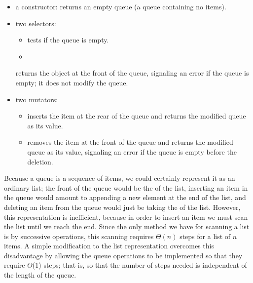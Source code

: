 \begin{itemize}

	\item
		a constructor:
		 returns an empty queue (a queue containing no items).

	\item
		two selectors:
		\begin{itemize}

			\item
				 tests if the queue is empty.

			\item

		\end{itemize}
		returns the object at the front of the queue, signaling an error if the queue is empty;
		it does not modify the queue.

	\item
		two mutators:
		\begin{itemize}

			\item
				 inserts the item at the rear of the queue and returns the modified queue as its value.

			\item
				 removes the item at the front of the queue and returns the modified queue as its value, signaling an error if the queue is empty before the deletion.

	\end{itemize}
\end{itemize}

Because a queue is a sequence of items, we could certainly represent it as an ordinary list;
the front of the queue would be the  of the list, inserting an item in the queue would amount to appending a new element at the end of the list, and deleting an item from the queue would just be taking the  of the list.
However, this representation is inefficient, because in order to insert an item we must scan the list until we reach the end.
Since the only method we have for scanning a list is by successive  operations, this scanning requires \( Θ(n) \) steps for a list of \( n \) items.
A simple modification to the list representation overcomes this disadvantage by allowing the queue operations to be implemented so that they require \( Θ \)(1) steps;
that is, so that the number of steps needed is independent of the length of the queue.

